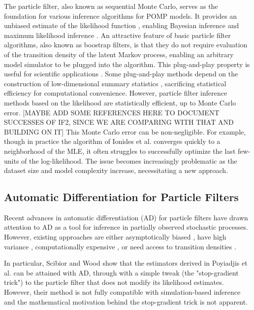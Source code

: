 \documentclass[9pt,twocolumn,twoside]{pnas-new}
\begin{document}
The particle filter, also known as sequential Monte Carlo, serves as the foundation for various inference algorithms for POMP models.
It provides an unbiased estimate of the likelihood function  \cite{delMoral04}, enabling Bayesian inference \cite{andrieu10,chopin13} and maximum likelihood inference \citep{ionides06-pnas,ionides15}.
An attractive feature of basic particle filter algorithms, also known as boostrap filters, is that they do not require evaluation of the transition density of the latent Markov process, enabling an arbitrary model simulator to be plugged into the algorithm.
This plug-and-play property is useful for scientific applications \cite{he10}.
Some plug-and-play methods depend on the construction of low-dimensional summary statistics \cite{wood10,toni09}, sacrificing statistical efficiency for computational convenience.
However, particle filter inference methods based on the likelihood are statistically efficient, up to Monte Carlo error.
[MAYBE ADD SOME REFERENCES HERE TO DOCUMENT SUCCESSES OF IF2, SINCE WE ARE COMPARING WITH THAT AND BUILDING ON IT]
This Monte Carlo error can be non-negligible.
For example, though in practice the algorithm of Ionides et al. \cite{ionides15} converges quickly to a neighborhood of the MLE, it often struggles to successfully optimize the last few-units of the log-likelihood.
The issue becomes increasingly problematic as the dataset size and model complexity increase, necessitating a new approach.

\subsection{Automatic Differentiation for Particle Filters}

Recent advances in automatic differentiation (AD) for particle filters \cite{naesseth18, jonschkowski18, corenflos21, scibior21, singh22} have drawn attention to AD as a tool for inference in partially observed stochastic processes. However, existing approaches are either asymptotically biased \cite{naesseth18, jonschkowski18}, have high variance \cite{poyiadjis11, scibior21}, computationally expensive \cite{corenflos21, chen24}, or need access to transition densities \cite{poyiadjis11, scibior21, singh22, chen24}.

In particular, Scibior and Wood \cite{scibior21} show that the estimators derived in Poyiadjis et al. \cite{poyiadjis11} can be attained with AD, through with a simple tweak (the "stop-gradient trick") to the particle filter that does not modify its likelihood estimates. However, their method is not fully compatible with simulation-based inference and the mathematical motivation behind the stop-gradient trick is not apparent. 
\end{document}
